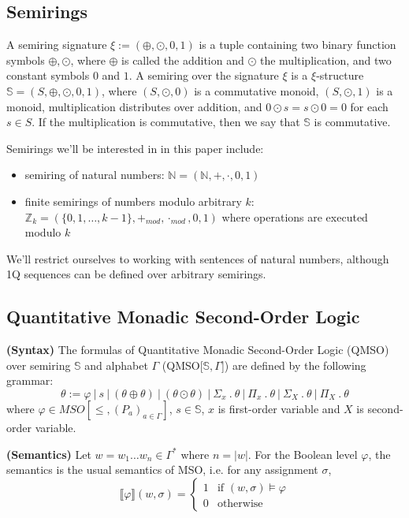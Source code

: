 \documentclass[12pt]{article}
\theoremstyle{definition}
\begin{document}
\subsection{Semirings}

A semiring signature $\xi := (\oplus, \odot, 0, 1)$ is a tuple containing two binary function symbols $\oplus, \odot$, where $\oplus$ is called the addition and $\odot$ the multiplication, and two constant symbols $0$ and $1$. A semiring over the signature $\xi$ is a $\xi$-structure $\mathbb{S} = (S, \oplus, \odot, 0, 1)$, where $(S, \odot, 0)$ is a commutative monoid, $(S, \odot, 1)$ is a monoid, multiplication distributes over addition, and $0 \odot s = s \odot 0 = 0$ for each $s \in S$. If the multiplication is commutative, then we say that $\mathbb{S}$ is commutative.

Semirings we'll be interested in in this paper include:

\begin{itemize}
    \item semiring of natural numbers: $\mathbb{N} = (\mathbb{N}, +, \cdot, 0, 1)$
    \item finite semirings of numbers modulo arbitrary $k$: $ \mathbb{Z}_k = (\{0,1,\ldots,k-1\}, +_{mod}, \cdot_{mod}, 0, 1)$ where operations are executed modulo $k$
\end{itemize}

We'll restrict ourselves to working with sentences of natural numbers, although 1Q sequences can be defined over arbitrary semirings.

\subsection{Quantitative Monadic Second-Order Logic}

\textbf{(Syntax)} The formulas of Quantitative Monadic Second-Order Logic (QMSO) over semiring $\mathbb{S}$ and alphabet $\Gamma$ (QMSO[$\mathbb{S}, \Gamma$]) are defined by the following grammar:
$$ \theta := \varphi \ | \ s \ | \ (\theta \oplus \theta) \ | \ (\theta \odot \theta) \ | \ \Sigma_x \ . \ \theta \ | \ \Pi_x \ . \ \theta \ | \ \Sigma_X \ . \ \theta \ | \ \Pi_X \ . \ \theta$$
where $\varphi \in MSO[\leq, (P_a)_{a \in \Gamma}]$, $s \in \mathbb{S}$, $x$ is first-order variable and $X$ is second-order variable.

\textbf{(Semantics)} Let $w 
= w_1 \dots w_n \in \Gamma^*$ where $n = |w|$. For the Boolean level $\varphi$, the semantics is the usual semantics of MSO, i.e. for any assignment $\sigma$,
\begin{equation*}
    \llbracket\varphi\rrbracket(w, \sigma) =
      \begin{cases}
        1 & \text{if $(w, \sigma) \models \varphi$}\\
        0 & \text{otherwise}
      \end{cases}       
\end{equation*}
\end{document}
